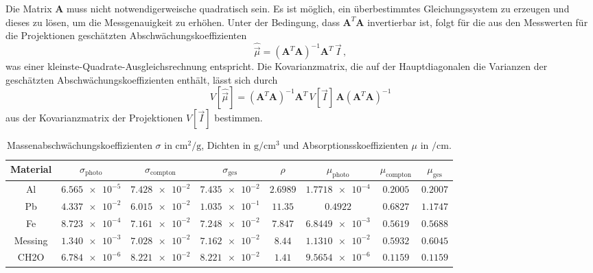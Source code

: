 Die Matrix $\symbf{A}$ muss nicht notwendigerweische quadratisch sein. Es ist möglich, ein überbestimmtes Gleichungssystem zu erzeugen und dieses zu lösen, um die Messgenauigkeit zu erhöhen. Unter der Bedingung, dass $\symbf{A}^T \symbf{A}$ invertierbar ist, folgt für die aus den Messwerten für die Projektionen geschätzten Abschwächungskoeffizienten
\begin{equation}
	\hat{\vec{\mu}} = (\symbf{A}^T \symbf{A})^{-1} \symbf{A}^T \, \vec{I}\,,
	\label{eqn:mumatrix}
\end{equation}
was einer kleinste-Quadrate-Ausgleichsrechnung entspricht.
Die Kovarianzmatrix, die auf der Hauptdiagonalen die Varianzen der geschätzten Abschwächungskoeffizienten enthält, lässt sich durch
\begin{equation}
	V[\hat{\vec{\mu}}] = (\symbf{A}^T \symbf{A})^{-1} \symbf{A}^T \, V[\vec{I}] \, \symbf{A} (\symbf{A}^T \symbf{A})^{-1}
\end{equation}
aus der Kovarianzmatrix der Projektionen $V[\vec{I}]$ bestimmen.



\begin{table}[htp]
	\begin{center}
    \caption{Massenabschwächungskoeffizienten $\sigma$ in $\si{\centi\meter\squared\per\gram}$, Dichten in $\si{\gram\per\centi\meter\cubed}$ und Absorptionsskoeffizienten $\mu$ in $\si{\per\centi\meter}$.}
    \label{tab:dicke}
		\begin{tabular}{cccccccc}
		\toprule
			Material & $\sigma_{\text{photo}}$ & $\sigma_{\text{compton}}$ & $\sigma_{\text{ges}}$ & $\rho$ & $\mu_{\text{photo}}$ & $\mu_{\text{compton}}$ & $\mu_{\text{ges}}$\\
			\midrule
			Al & $\num{6.565e-5}$ & $\num{7.428e-2}$ & $\num{7.435e-2}$ & $\num{2.6989}$ & $\num{1.7718e-4}$ & $\num{0.2005}$ & $\num{0.2007}$\\
      Pb & $\num{4.337e-2}$ & $\num{6.015e-2}$ & $\num{1.035e-1}$ & $\num{11.35}$ & $\num{0.4922}$ & $\num{0.6827}$ & $\num{1.1747}$\\
      Fe & $\num{8.723e-4}$ & $\num{7.161e-2}$ & $\num{7.248e-2}$ & $\num{7.847}$ & $\num{6.8449e-3}$ & $\num{0.5619}$ & $\num{0.5688}$\\
      Messing & $\num{1.340e-3}$ & $\num{7.028e-2}$ & $\num{7.162e-2}$ & $\num{8.44}$ & $\num{1.1310e-2}$ & $\num{0.5932}$ & $\num{0.6045}$\\
      CH2O & $\num{6.784e-6}$ & $\num{8.221e-2}$ & $\num{8.221e-2}$ & $\num{1.41}$ & $\num{9.5654e-6}$ & $\num{0.1159}$ & $\num{0.1159}$\\
		\bottomrule
		\end{tabular}
	\end{center}
\end{table}
